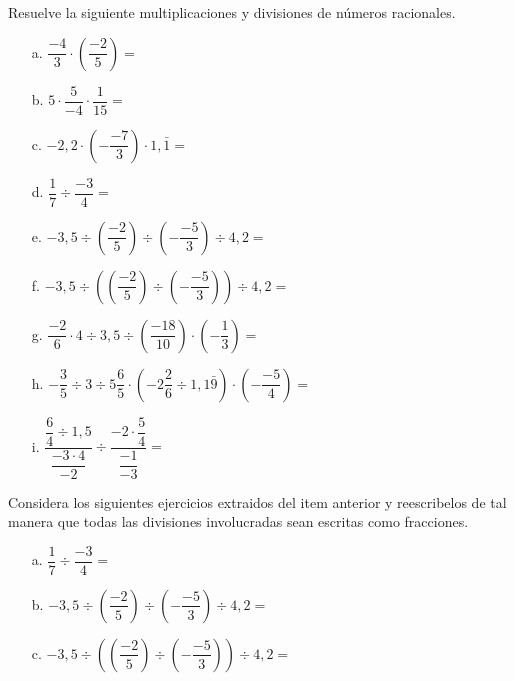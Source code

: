 \documentclass[spanish,letterpaper, 11pt, addpoints, answers]{exam}
\begin{document}
\begin{questions}
\question Resuelve la siguiente multiplicaciones y divisiones de números racionales.
\begin{multicols}{2}
  

\begin{itemize}
\item[a.] $\dfrac{-4}{3}\cdot \left(\dfrac{-2}{5}\right)=$

\item[b.] $5\cdot \dfrac{5}{-4}\cdot \dfrac{1}{15}=$

\item[c.] $-2{,}2\cdot \left(-\dfrac{-7}{3}\right)\cdot 1{,}\bar{1}=$

\item[d.] $\dfrac{1}{7}\div \dfrac{-3}{4}=$

\item[e.] $-3{,}5\div \left(\dfrac{-2}{5}\right)\div \left(-\dfrac{-5}{3}\right)\div 4{,}2=$

\item[f.] $-3{,}5\div \left(\left(\dfrac{-2}{5}\right)\div \left(-\dfrac{-5}{3}\right)\right)\div 4{,}2=$

\item[g.] $\dfrac{-2}{6}\cdot 4\div 3{,}5\div \left(\dfrac{-18}{10}\right)\cdot \left(-\dfrac{1}{3}\right)=$

\item[h.] $-\dfrac{3}{5}\div 3\div 5\dfrac{6}{5}\cdot \left(-2\dfrac{2}{6}\div1{,}1\bar{9}\right)\cdot \left(-\dfrac{-5}{4}\right)=$

\item[i.] $\dfrac{\dfrac{6}{4}\div 1{,}5}{\dfrac{-3\cdot 4}{-2}}\div\dfrac{-2\cdot \dfrac{5}{4}}{\dfrac{-1}{-3}}=$

\end{itemize}

\end{multicols}
\question Considera los siguientes ejercicios extraidos del item anterior y reescribelos de tal manera que todas las divisiones involucradas sean escritas como fracciones.

\begin{itemize}
  \item[a.] $\dfrac{1}{7}\div \dfrac{-3}{4}=$

  \item[b.] $-3{,}5\div \left(\dfrac{-2}{5}\right)\div \left(-\dfrac{-5}{3}\right)\div 4{,}2=$

  \item[c.] $-3{,}5\div \left(\left(\dfrac{-2}{5}\right)\div \left(-\dfrac{-5}{3}\right)\right)\div 4{,}2=$


\end{itemize}
\end{questions}
\end{document}
